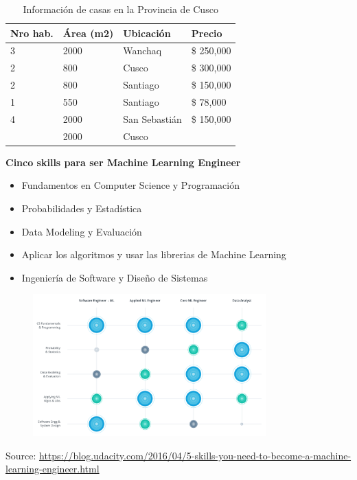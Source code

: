 \documentclass[english,svgnames,notes=hide,12pt]{beamer}
\begin{document}
\begin{frame}
\begin{table}[]
    \caption{Informaci\'on de casas en la Provincia de Cusco}
    \begin{tabular}{|l|l|l|l|}
        \hline
        \textbf{Nro hab.} & \textbf{Área (m2)} & \textbf{Ubicación}     & \textbf{Precio}     \\ \hline
        3                & 2000      & Wanchaq       & \$ 250,000 \\ \hline
        2                & 800       & Cusco         & \$ 300,000 \\ \hline
        2                & 800       & Santiago      & \$ 150,000 \\ \hline
        1                & 550       & Santiago      & \$ 78,000  \\ \hline
        4                & 2000      & San Sebastián & \$ 150,000 \\ \hline
        \uncover<2>{\color{red}
        3                & \color{red} 2000      & \color{red}Cusco         & \color{red}{\$ ???????} } \\ \hline
    \end{tabular}
\end{table}
\end{frame}

\begin{frame}
    \textbf{Cinco skills para ser Machine Learning Engineer}
    \begin{itemize}
        \item Fundamentos en Computer Science y Programaci\'on
        \item Probabilidades y Estad\'istica
        \item Data Modeling y Evaluaci\'on
        \item Aplicar los algoritmos y usar las librerias de Machine Learning
        \item Ingenier\'ia de Software y Dise\~no de Sistemas
    \end{itemize}
\end{frame}

\begin{frame}
    \begin{figure}
        \includegraphics[width=0.8\textwidth]{imgs/cs-skills.png}
    \end{figure}
    \centering\tiny{Source: \url{https://blog.udacity.com/2016/04/5-skills-you-need-to-become-a-machine-learning-engineer.html}}
\end{frame}
\end{document}

